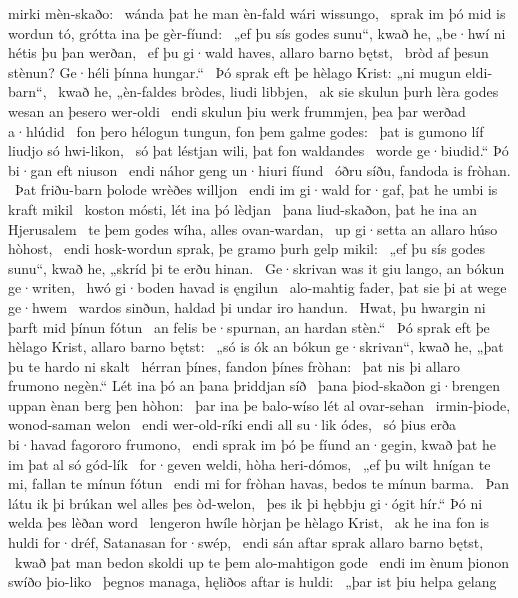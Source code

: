 mirki mèn-skaðo: \hld\ wánda þat he man èn-fald
wári wissungo, \hld\ sprak im þó mid is wordun tó,
grótta ina þe gèr-fíund: \hld\ „ef þu sís godes sunu“, kwað he,
„be·hwí ni hétis þu þan werðan, \hld\ ef þu gi·wald haves,
allaro barno bętst, \hld\ bròd af þesun stènun?
Ge·héli þínna hungar.“ \hld\ Þó sprak eft þe hèlago Krist:
„ni mugun eldi-barn“, \hld\ kwað he, „èn-faldes bròdes,
liudi libbjen, \hld\ ak sie skulun þurh lèra godes
wesan an þesero wer-oldi \hld\ endi skulun þiu werk frummjen,
þea þar werðad a·hlúdid \hld\ fon þero hélogun tungun,
fon þem galme godes: \hld\ þat is gumono líf
liudjo só hwi-likon, \hld\ só þat léstjan wili,
þat fon waldandes \hld\ worde ge·biudid.“
Þó bi·gan eft niuson \hld\ endi náhor geng
un·hiuri fíund \hld\ óðru síðu,
fandoda is fròhan. \hld\ Þat friðu-barn þolode
wrèðes willjon \hld\ endi im gi·wald for·gaf,
þat he umbi is kraft mikil \hld\ koston mósti,
lét ina þó lèdjan \hld\ þana liud-skaðon,
þat he ina an Hjerusalem \hld\ te þem godes wíha,
alles ovan-wardan, \hld\ up gi·setta
an allaro húso hòhost, \hld\ endi hosk-wordun sprak,
þe gramo þurh gelp mikil: \hld\ „ef þu sís godes sunu“, kwað he,
„skríd þi te erðu hinan. \hld\ Ge·skrivan was it giu lango,
an bókun ge·writen, \hld\ hwó gi·boden havad
is ęngilun \hld\ alo-mahtig fader,
þat sie þi at wege ge·hwem \hld\ wardos sinðun,
haldad þi undar iro handun. \hld\ Hwat, þu hwargin ni þarft
mid þínun fótun \hld\ an felis be·spurnan,
an hardan stèn.“ \hld\ Þó sprak eft þe hèlago Krist,
allaro barno bętst: \hld\ „só is ók an bókun ge·skrivan“, kwað he,
„þat þu te hardo ni skalt \hld\ hérran þínes,
fandon þínes fròhan: \hld\ þat nis þi allaro frumono negèn.“
Lét ina þó an þana þriddjan síð \hld\ þana þiod-skaðon
gi·brengen uppan ènan berg þen hòhon: \hld\ þar ina þe balo-wíso
lét al ovar-sehan \hld\ irmin-þiode,
wonod-saman welon \hld\ endi wer-old-ríki
endi all su·lik ódes, \hld\ só þius erða bi·havad
fagororo frumono, \hld\ endi sprak im þó þe fíund an·gegin,
kwað þat he im þat al só gód-lík \hld\ for·geven weldi,
hòha heri-dómos, \hld\ „ef þu wilt hnígan te mi,
fallan te mínun fótun \hld\ endi mi for fròhan havas,
bedos te mínun barma. \hld\ Þan látu ik þi brúkan wel
alles þes òd-welon, \hld\ þes ik þi hębbju gi·ógit hír.“
Þó ni welda þes lèðan word \hld\ lengeron hwíle
hòrjan þe hèlago Krist, \hld\ ak he ina fon is huldi for·dréf,
Satanasan for·swép, \hld\ endi sán aftar sprak
allaro barno bętst, \hld\ kwað þat man bedon skoldi
up te þem alo-mahtigon gode \hld\ endi im ènum þionon
swíðo þio-liko \hld\ þegnos managa,
hęliðos aftar is huldi: \hld\ „þar ist þiu helpa gelang
